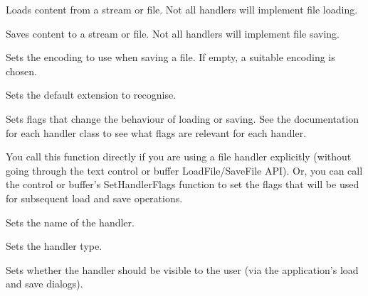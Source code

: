 
Loads content from a stream or file. Not all handlers will implement file loading.

\label{wxrichtextfilehandlersavefile}



Saves content to a stream or file. Not all handlers will implement file saving.

\label{wxrichtextfilehandlersetencoding}


Sets the encoding to use when saving a file. If empty, a suitable encoding is chosen.

\label{wxrichtextfilehandlersetextension}


Sets the default extension to recognise.

\label{wxrichtextfilehandlersetflags}


Sets flags that change the behaviour of loading or saving. See the documentation for each
handler class to see what flags are relevant for each handler.

You call this function directly if you are using a file handler explicitly (without
going through the text control or buffer LoadFile/SaveFile API). Or, you can
call the control or buffer's SetHandlerFlags function to set the flags that will
be used for subsequent load and save operations.

\label{wxrichtextfilehandlersetname}


Sets the name of the handler.

\label{wxrichtextfilehandlersettype}


Sets the handler type.

\label{wxrichtextfilehandlersetvisible}


Sets whether the handler should be visible to the user (via the application's load and save
dialogs).

